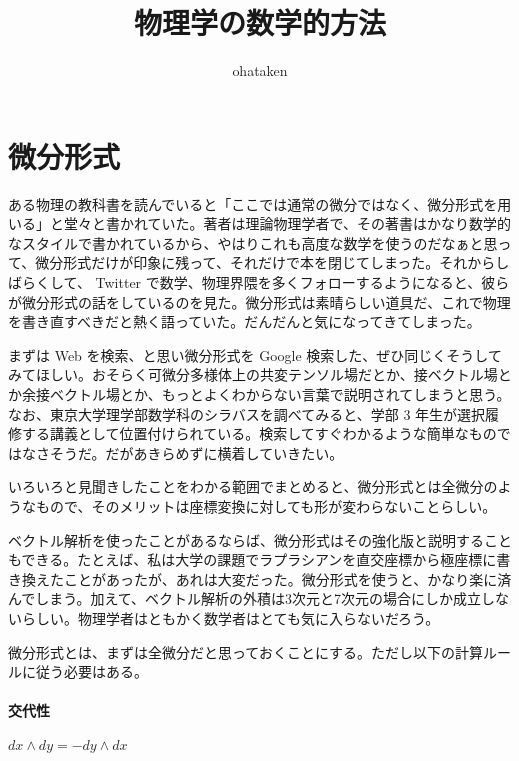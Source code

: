 \title{\huge 物理学の数学的方法}
\author{ohataken}
\maketitle

\newpage


\section{微分形式}

ある物理の教科書を読んでいると「ここでは通常の微分ではなく、微分形式を用いる」と堂々と書かれていた。著者は理論物理学者で、その著書はかなり数学的なスタイルで書かれているから、やはりこれも高度な数学を使うのだなぁと思って、微分形式だけが印象に残って、それだけで本を閉じてしまった。それからしばらくして、 Twitter で数学、物理界隈を多くフォローするようになると、彼らが微分形式の話をしているのを見た。微分形式は素晴らしい道具だ、これで物理を書き直すべきだと熱く語っていた。だんだんと気になってきてしまった。

まずは Web を検索、と思い微分形式を Google 検索した、ぜひ同じくそうしてみてほしい。おそらく可微分多様体上の共変テンソル場だとか、接ベクトル場とか余接ベクトル場とか、もっとよくわからない言葉で説明されてしまうと思う。なお、東京大学理学部数学科のシラバスを調べてみると、学部 3 年生が選択履修する講義として位置付けられている。検索してすぐわかるような簡単なものではなさそうだ。だがあきらめずに横着していきたい。

いろいろと見聞きしたことをわかる範囲でまとめると、微分形式とは全微分のようなもので、そのメリットは座標変換に対しても形が変わらないことらしい。

ベクトル解析を使ったことがあるならば、微分形式はその強化版と説明することもできる。たとえば、私は大学の課題でラプラシアンを直交座標から極座標に書き換えたことがあったが、あれは大変だった。微分形式を使うと、かなり楽に済んでしまう。加えて、ベクトル解析の外積は3次元と7次元の場合にしか成立しないらしい。物理学者はともかく数学者はとても気に入らないだろう。

\hrulefill

微分形式とは、まずは全微分だと思っておくことにする。ただし以下の計算ルールに従う必要はある。

\paragraph{交代性}

$ d x \wedge d y = - d y \wedge d x $

